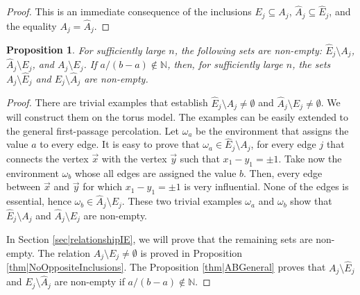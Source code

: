 \documentclass[reqno]{amsart}
\newtheorem{proposition}{Proposition}
\begin{document}
\begin{proof}
This is an immediate consequence of the inclusions $E_j \subseteq A_j$, $\hat A_j \subseteq \hat E_j$, and the equality $A_j = \hat A_j$.
\end{proof}


\begin{proposition}\label{thm|GeneralVennDiagram} For sufficiently large $n$, the following sets are non-empty:
$\hat E_j\setminus A_j$, $\hat A_j\setminus E_j$,  and $A_j\setminus E_j$.
If $a/(b-a)\notin\mathbb N$, then, for sufficiently large $n$, the sets 
 $A_j\setminus \hat E_j$ and $E_j\setminus \hat A_j$
are non-empty.
\end{proposition}
\begin{proof}
There are trivial examples that establish $\hat E_j\setminus A_j \neq \emptyset$ and $\hat A_j\setminus E_j\neq\emptyset$. We will construct them on the torus model. The examples can be easily extended to the general first-passage percolation. Let $\omega_a$ be the environment that assigns the value $a$ to every edge. It is easy to prove that $\omega_a\in \hat E_j\setminus A_j$, for every edge $j$ that connects the vertex $\overrightarrow x$ with the vertex $\overrightarrow y$ such that $x_1-y_1=\pm 1$. 
 Take now the environment $\omega_b$ whose all edges are assigned the value $b$. Then, every edge between $\overrightarrow x$ and $\overrightarrow y$ for which $x_1-y_1=\pm 1$ 
 is very influential. None of the edges is essential, hence $\omega_b\in \hat A_j\setminus E_j$.
 These two trivial examples $\omega_a$ and $\omega_b$ show that $\hat E_j\setminus A_j$ and $\hat A_j\setminus E_j$ are non-empty. 
 
In Section \ref{sec|relationshipIE}, we will prove that the remaining sets are non-empty. The relation $A_j\setminus E_j\neq\emptyset$ is proved in Proposition \ref{thm|NoOppositeInclusions}.
The Proposition \ref{thm|ABGeneral}
proves that $A_j\setminus \hat E_j$ and $E_j\setminus \hat A_j$ are non-empty if $a/(b-a)\notin \mathbb N$. 
\end{proof}


 
 
\end{document}
